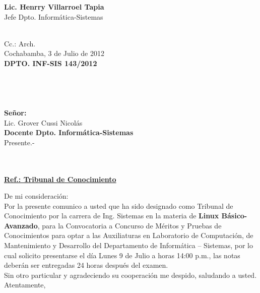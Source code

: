 \documentclass[letterpaper,11pt]{letter}
\begin{document}
\vspace{3.5cm}
\begin{center}
\begin{minipage}[b]{0.5\textwidth}
\begin{center}
{\bf Lic. Henrry Villarroel Tapia}\\
Jefe Dpto. Informática-Sistemas\\
\end{center}
\end{minipage}
\end{center}
~\\
Cc.: Arch.\\
\newpage
Cochabamba, 3 de Julio de 2012~\\
 \textbf{DPTO. INF-SIS 143/2012}\\
~\\
~\\
~\\
~\\
 \textbf{Señor:}~\\
Lic. Grover Cussi Nicolás~\\
 \textbf{Docente Dpto. Informática-Sistemas}~\\
Presente.-\\
~\\
~\\
\begin{center}
\underline{ \textbf{Ref.: Tribunal de Conocimiento}}
\end{center}
De mi consideración:\\
Por la presente comunico a usted que ha sido designado como Tribunal de Conocimiento por la carrera de Ing. Sistemas en la materia de \textbf{Linux Básico-Avanzado}, para la Convocatoria a Concurso de Méritos y Pruebas de Conocimientos para optar a las Auxiliaturas en Laboratorio de Computación, de Mantenimiento y Desarrollo del Departamento de Informática – Sistemas, por lo cual solicito presentarse el día Lunes 9 de Julio a horas 14:00 p.m., las notas deberán ser entregadas 24 horas después del examen.\\
Sin otro particular y agradeciendo su cooperación me despido, saludando a usted.\\
Atentamente,\\
\end{document}
